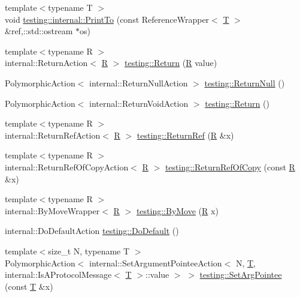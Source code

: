 \begin{DoxyCompactItemize}
\item 
{\footnotesize template$<$typename T $>$ }\\void \hyperlink{namespacetesting_1_1internal_a880d891d434f918b29a382f90e47cecb}{testing\+::internal\+::\+Print\+To} (const Reference\+Wrapper$<$ \hyperlink{functions__7_8js_adf1f3edb9115acb0a1e04209b7a9937b}{T} $>$ \&ref,\+::std\+::ostream $\ast$os)
\item 
{\footnotesize template$<$typename R $>$ }\\internal\+::\+Return\+Action$<$ \hyperlink{typedefs__9_8js_afb423b73ee7b6c04d2d54fc06e405404}{R} $>$ \hyperlink{namespacetesting_af6d1c13e9376c77671e37545cd84359c}{testing\+::\+Return} (\hyperlink{typedefs__9_8js_afb423b73ee7b6c04d2d54fc06e405404}{R} value)
\item 
Polymorphic\+Action$<$ internal\+::\+Return\+Null\+Action $>$ \hyperlink{namespacetesting_aa0331596e269114da101f810d3a1b88b}{testing\+::\+Return\+Null} ()
\item 
Polymorphic\+Action$<$ internal\+::\+Return\+Void\+Action $>$ \hyperlink{namespacetesting_a8da8e53d2e7bc4e3c531f7435ad04823}{testing\+::\+Return} ()
\item 
{\footnotesize template$<$typename R $>$ }\\internal\+::\+Return\+Ref\+Action$<$ \hyperlink{typedefs__9_8js_afb423b73ee7b6c04d2d54fc06e405404}{R} $>$ \hyperlink{namespacetesting_a18eda8fe9c89ee856c199a2e04ca1641}{testing\+::\+Return\+Ref} (\hyperlink{typedefs__9_8js_afb423b73ee7b6c04d2d54fc06e405404}{R} \&x)
\item 
{\footnotesize template$<$typename R $>$ }\\internal\+::\+Return\+Ref\+Of\+Copy\+Action$<$ \hyperlink{typedefs__9_8js_afb423b73ee7b6c04d2d54fc06e405404}{R} $>$ \hyperlink{namespacetesting_ac1b75444c89371dc25ebcfcc48336201}{testing\+::\+Return\+Ref\+Of\+Copy} (const \hyperlink{typedefs__9_8js_afb423b73ee7b6c04d2d54fc06e405404}{R} \&x)
\item 
{\footnotesize template$<$typename R $>$ }\\internal\+::\+By\+Move\+Wrapper$<$ \hyperlink{typedefs__9_8js_afb423b73ee7b6c04d2d54fc06e405404}{R} $>$ \hyperlink{namespacetesting_acaa432211a3aec62e3d0f24b47bd2dae}{testing\+::\+By\+Move} (\hyperlink{typedefs__9_8js_afb423b73ee7b6c04d2d54fc06e405404}{R} x)
\item 
internal\+::\+Do\+Default\+Action \hyperlink{namespacetesting_ae041df61ff61ccb9753ba15b4309e1a6}{testing\+::\+Do\+Default} ()
\item 
{\footnotesize template$<$size\+\_\+t N, typename T $>$ }\\Polymorphic\+Action$<$ internal\+::\+Set\+Argument\+Pointee\+Action$<$ N, \hyperlink{functions__7_8js_adf1f3edb9115acb0a1e04209b7a9937b}{T}, internal\+::\+Is\+A\+Protocol\+Message$<$ \hyperlink{functions__7_8js_adf1f3edb9115acb0a1e04209b7a9937b}{T} $>$\+::value $>$ $>$ \hyperlink{namespacetesting_a5740a5033b88c37666fcd09a269d123f}{testing\+::\+Set\+Arg\+Pointee} (const \hyperlink{functions__7_8js_adf1f3edb9115acb0a1e04209b7a9937b}{T} \&x)

\end{DoxyCompactItemize}
